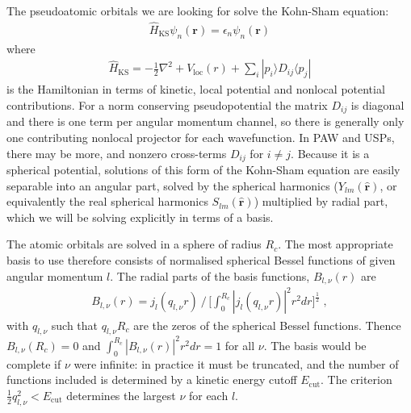 \documentclass[letterpaper,10pt,english]{sphinxmanual}
\begin{document}
The pseudoatomic orbitals we are looking for solve the Kohn-Sham
equation:
\begin{equation*}
\begin{split}\hat{H}_{\mathrm{KS}}\psi_{n}(\mathbf{r})=\epsilon_{n}\psi_{n}(\mathbf{r})\end{split}
\end{equation*}
where
\begin{equation*}
\begin{split}\hat{H}_{\mathrm{KS}}=-\frac{1}{2}\nabla^{2}+V_{\mathrm{loc}}(r)+\sum_{i}|p_{i}\rangle D_{ij}\langle p_{j}|\end{split}
\end{equation*}
is the Hamiltonian in terms of kinetic, local potential and nonlocal
potential contributions. For a norm conserving pseudopotential the
matrix \(D_{ij}\) is diagonal and there is one term per angular
momentum channel, so there is generally only one contributing nonlocal
projector for each wavefunction. In PAW and USPs, there may be more, and
nonzero cross-terms \(D_{ij}\) for \(i\neq j\). Because it is a
spherical potential, solutions of this form of the Kohn-Sham equation
are easily separable into an angular part, solved by the spherical
harmonics (\(Y_{lm}(\hat{\mathbf{r}})\), or equivalently the real
spherical harmonics \(S_{lm}(\hat{\mathbf{r}})\)) multiplied by
radial part, which we will be solving explicitly in terms of a basis.

The atomic orbitals are solved in a sphere of radius \(R_{c}\). The
most appropriate basis to use therefore consists of normalised spherical
Bessel functions of given angular momentum \(l\). The radial parts
of the basis functions, \(B_{l,\nu}(r)\) are
\begin{equation*}
\begin{split}B_{l,\nu}(r)=j_{l}(q_{l,\nu}r)\:/\,\Big[\int_{0}^{R_{c}}|j_{l}(q_{l,\nu}r)|^{2}r^{2}dr\Big]^{\frac{1}{2}}\;,\end{split}
\end{equation*}
with \(q_{l,\nu}\) such that \(q_{l,\nu}R_{c}\) are the zeros
of the spherical Bessel functions. Thence \(B_{l,\nu}(R_{c})=0\) and
\(\int_{0}^{R_{c}}|B_{l,\nu}(r)|^{2}r^{2}dr=1\) for all \(\nu\).
The basis would be complete if \(\nu\) were infinite: in practice it
must be truncated, and the number of functions included is determined by
a kinetic energy cutoff \(E_{\mathrm{cut}}\). The criterion
\(\frac{1}{2}q_{l,\nu}^{2}<E_{\mathrm{cut}}\) determines the largest
\(\nu\) for each \(l\).
\end{document}
